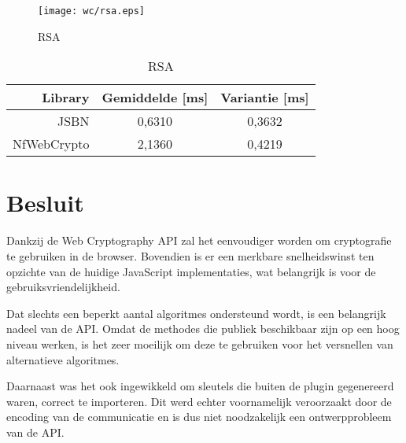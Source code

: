 \begin{figure}
  \centering
  \texttt{[image: wc/rsa.eps]}
  \caption{RSA}
  \label{fig:wc:rsa}
\end{figure}

\begin{table}
  \centering
  \caption{RSA}
  \label{tab:wc:rsa}
  \begin{tabular}{r | c c}
    Library & Gemiddelde [ms] & Variantie [ms] \\ \hline
    JSBN & 0,6310 & 0,3632  \\
    NfWebCrypto & 2,1360 & 0,4219
  \end{tabular}
\end{table}

\section{Besluit}

Dankzij de Web Cryptography API zal het eenvoudiger worden om cryptografie te gebruiken in de browser. Bovendien is er een merkbare snelheidswinst ten opzichte van de huidige JavaScript implementaties, wat belangrijk is voor de gebruiksvriendelijkheid. 

\npar Dat slechts een beperkt aantal algoritmes ondersteund wordt, is een belangrijk nadeel van de API. Omdat de methodes die publiek beschikbaar zijn op een hoog niveau werken, is het zeer moeilijk om deze te gebruiken voor het versnellen van alternatieve algoritmes.

\npar Daarnaast was het ook ingewikkeld om sleutels die buiten de plugin gegenereerd waren, correct te importeren. Dit werd echter voornamelijk veroorzaakt door de encoding van de communicatie en is dus niet noodzakelijk een ontwerpprobleem van de API.